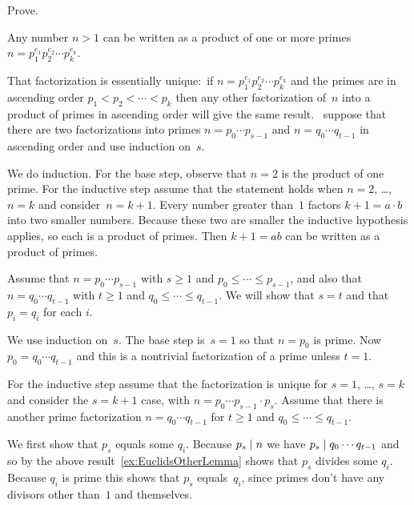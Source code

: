 \documentclass{ibl}  %
\begin{document}
\begin{ex}  Prove.
\begin{exes}
\item Any number $n>1$ can be written as a product of one or more primes
$n=p_1^{e_1}p_2^{e_2}\cdots p_k^{e_k}$.
\item That factorization is essentially unique:~if 
$n=p_1^{e_1}p_2^{e_2}\cdots p_k^{e_k}$ and the primes
are in ascending order $p_1<p_2<\cdots<p_k$ then any other
factorization of~$n$ into a product of primes in ascending order will give the
same result. 
\hint~suppose that there are two factorizations into primes $n=p_0\cdots p_{s-1}$
and $n=q_0\cdots q_{t-1}$ in ascending order and use induction on~$s$.     
\end{exes}
\begin{ans}
\begin{exes}
\item We do induction.
For the base step, observe that $n=2$ is the product of one prime. 
For the inductive step assume that the statement holds when $n=2$, \ldots, 
$n=k$ and consider~$n=k+1$.
Every number greater than~$1$ factors $k+1=a\cdot b$ into two smaller
numbers.
Because these two are smaller
the inductive hypothesis applies, so each is a product of 
primes.
Then $k+1=ab$ can be written as a product of primes.
\item Assume that $n=p_0\cdots p_{s-1}$ with $s\geq 1$ and
$p_0\leq\cdots \leq p_{s-1}$, 
and also that $n=q_0\cdots q_{t-1}$ with $t\geq 1$ 
and $q_0\leq\cdots \leq q_{t-1}$.
We will show that $s=t$ and that $p_i=q_i$ for each $i$.

We use induction on~$s$.
The base step is~$s=1$ so that $n=p_0$ is prime.
Now $p_0=q_0\cdots q_{t-1}$ and this is a nontrivial factorization of a prime
unless $t=1$.

For the inductive step assume that the factorization is unique for
$s=1$, \ldots, $s=k$ and consider the $s=k+1$ case, with
$n=p_0\cdots p_{s-1}\cdot p_s$.   
Assume that there is another prime factorization $n=q_0\cdots q_{t-1}$
for $t\geq 1$ and $q_0\leq\cdots \leq q_{t-1}$.

We first show that $p_s$ equals some $q_i$.
Because $p_s\mid n$ we have $p_s\mid q_0\cdots q_{t-1}$ and so
by the above result~\ref{ex:EuclidsOtherLemma} shows that
$p_s$ divides some $q_i$.
Because $q_i$ is prime this shows that $p_s$ equals~$q_i$,
since primes don't have any divisors other than~$1$ and themselves.


\end{exes}
\end{ans}
\end{ex}
\end{document}
